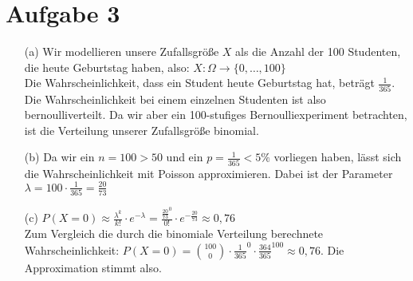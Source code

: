 \documentclass[10pt,a4paper]{article}
\begin{document}
\section*{Aufgabe 3}
\begin{itemize}
\item[(a)]
Wir modellieren unsere Zufallsgröße $X$ als die Anzahl der 100 Studenten, die heute Geburtstag haben, also: $X: \Omega \rightarrow \{0,\dots,100\}$\\
Die Wahrscheinlichkeit, dass ein Student heute Geburtstag hat, beträgt $\frac{1}{365}$. Die Wahrscheinlichkeit bei einem einzelnen Studenten ist also bernoulliverteilt. Da wir aber ein 100-stufiges Bernoulliexperiment betrachten, ist die Verteilung unserer Zufallsgröße binomial.

\item[(b)]Da wir ein $n = 100 > 50$ und ein $p = \frac{1}{365} < 5\%$ vorliegen haben, lässt sich die Wahrscheinlichkeit mit Poisson approximieren. Dabei ist der Parameter $\lambda = 100 \cdot \frac{1}{365} = \frac{20}{73}$

\item[(c)] $P(X=0) \approx \frac{\lambda^k}{k!} \cdot e^{-\lambda} = \frac{\frac{20}{73}^0}{0!} \cdot e^{-\frac{20}{73}} \approx 0,76$\\
Zum Vergleich die durch die binomiale Verteilung berechnete Wahrscheinlichkeit: $P(X = 0) = \binom{100}{0} \cdot \frac{1}{365}^0 \cdot \frac{364}{365}^100 \approx 0,76$. Die Approximation stimmt also.
\end{itemize}
\end{document}
